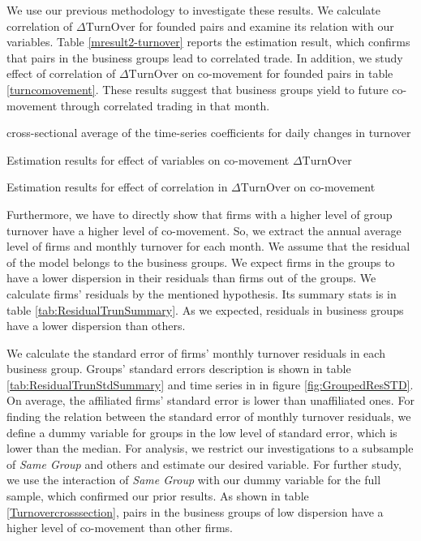 	We use our previous methodology to investigate these results. We calculate correlation of $ \Delta \text{TurnOver} $ for founded pairs and examine its relation with our variables. Table \ref{mresult2-turnover} reports the estimation result, which confirms that pairs in the business groups lead to correlated trade. In addition, we study effect of  correlation of $ \Delta \text{TurnOver} $ on co-movement for founded pairs in table \ref{turncomovement}. These results suggest that business groups yield to future co-movement through correlated trading in that month.
  
{\begin{table}[htbp]
	\centering
	\caption{cross-sectional average of the time-series coefficients for daily changes in turnover }
	\resizebox{!}{!}{
		
	} \label{turnover}
\end{table}}


	\begin{table}[htbp]
		\centering
		\caption{Estimation results for effect of variables on  co-movement $ \Delta \text{TurnOver} $}
		\label{mresult2-turnover}
		\resizebox{\textwidth}{!}{
			\centering
			
		}
	\end{table}


	\begin{table}[htbp]
		\centering
		\caption{Estimation results for effect of correlation in $ \Delta \text{TurnOver} $ on  co-movement }
		\label{turncomovement}
		\resizebox{\textwidth}{!}{
			\centering
			
		}
	\end{table}



Furthermore, we have to directly show that firms with a higher level of group turnover have a higher level of co-movement. So, we extract the annual average level of firms and monthly turnover for each month. We assume that the residual of the model belongs to the business groups. We expect firms in the groups to have a lower dispersion in their residuals than firms out of the groups. We calculate firms' residuals by the mentioned hypothesis. Its summary stats is in table \ref{tab:ResidualTrunSummary}. As we expected, residuals in business groups have a lower dispersion than others.


We calculate the standard error of firms' monthly turnover residuals in each business group. Groups' standard errors description is shown in table \ref{tab:ResidualTrunStdSummary} and time series in in figure \ref{fig:GroupedResSTD}. On average, the affiliated firms' standard error is lower than unaffiliated ones. For finding the relation between the standard error of monthly turnover residuals, we define a dummy variable for groups in the low level of standard error, which is lower than the median. For analysis, we restrict our investigations to a subsample of \textit{Same Group} and others and estimate our desired variable.   For further study, we use the interaction of \textit{Same Group} with our dummy variable for the full sample, which confirmed our prior results. As shown in table \ref{Turnovercrosssection}, pairs in the business groups of low dispersion have a higher level of co-movement than other firms.



